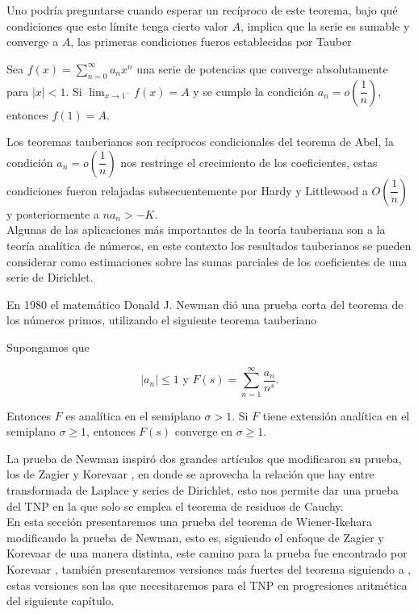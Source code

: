 Uno podría preguntarse cuando esperar un recíproco de este teorema, bajo qué condiciones que este límite tenga cierto valor $A$, implica que la serie es sumable y converge a $A$, las primeras condiciones fueros establecidas por Tauber

\begin{prop}[Tauber, 1897]
    Sea $f(x)=\displaystyle\sum_{n=0}^{\infty} a_n x^n$ una serie de potencias que converge absolutamente para $|x|<1$.
Si $\lim_{x \rightarrow 1^{-}} f(x)=A$ y se cumple la condición $a_n=o\left(\dfrac{1}{n}\right)$, entonces $f(1)=A$.
\end{prop}

Los teoremas tauberianos son recíprocos condicionales del teorema de Abel, la condición $a_n=o\left(\dfrac{1}{n}\right)$ nos restringe el crecimiento de los coeficientes, estas condiciones fueron relajadas subsecuentemente por Hardy y Littlewood a $O\left(\dfrac{1}{n}\right)$ y posteriormente a $na_n>-K$.\\

Algunas de las aplicaciones más importantes de la teoría tauberiana son a la teoría analítica de números, en este contexto los resultados tauberianos se pueden considerar como estimaciones sobre las sumas parciales de los coeficientes de una serie de Dirichlet.

En 1980 el matemático Donald J. Newman dió una prueba corta del teorema de los números primos, utilizando el siguiente teorema tauberiano

\begin{theorem}[Newman]
    Supongamos que 

    $$|a_n|\leq 1 \text{ y } F(s)=\sum_{n=1}^{\infty} \frac{a_n}{n^s}.$$

    Entonces $F$ es analítica en el semiplano $\sigma>1$. Si $F$ tiene extensión analítica en el semiplano $\sigma\geq 1$, entonces $F(s)$ converge en $\sigma\geq 1$.
\end{theorem}

La prueba de Newman inspiró dos grandes artículos que modificaron su prueba, los de Zagier \cite{zagier1997newman} y Korevaar \cite{korevaar1982newman}, en donde se aprovecha la relación que hay entre transformada de Laplace y series de Dirichlet, esto nos permite dar una prueba del TNP en la que solo se emplea el teorema de residuos de Cauchy.\\

En esta sección presentaremos una prueba del teorema de Wiener-Ikehara modificando la prueba de Newman, esto es, siguiendo el enfoque de Zagier y Korevaar de una manera distinta, este camino para la prueba fue encontrado por Korevaar \cite{korevaar2006wiener}, también presentaremos versiones más fuertes del teorema siguiendo a \cite{vatwani2015simple}, estas versiones son las que necesitaremos para el TNP en progresiones aritmética del siguiente capítulo.


